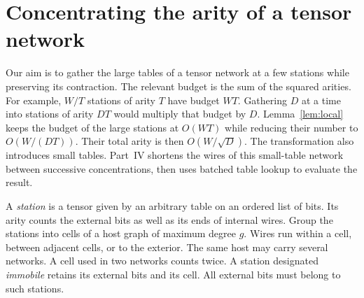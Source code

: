 \section{Concentrating the arity of a tensor network}\label{sec:local}


Our aim is to gather the large tables of a tensor network at a few
stations while preserving its contraction. The relevant budget is the
sum of the squared arities. For example, \(W/T\) stations of arity
\(T\) have budget \(WT\). Gathering \(D\) at a time into stations of
arity \(DT\) would multiply that budget by \(D\).
Lemma~\ref{lem:local} keeps the budget of the large stations at \(O(WT)\)
while reducing their number to \(O(W/(DT))\). Their total arity is then
\(O(W/\sqrt D)\). The transformation also introduces small tables.
Part~IV shortens the wires of this small-table network between successive
concentrations, then uses batched table lookup to evaluate the result.

A \emph{station} is a tensor given by an arbitrary table on an ordered
list of bits. Its arity counts the external bits as well as its ends of
internal wires. Group the stations into cells of a host graph of maximum
degree \(g\). Wires run within a cell, between adjacent cells, or to the
exterior. The same host may carry several networks. A cell used in two
networks counts twice. A station designated \emph{immobile} retains its
external bits and its cell. All external bits must belong to such stations.

